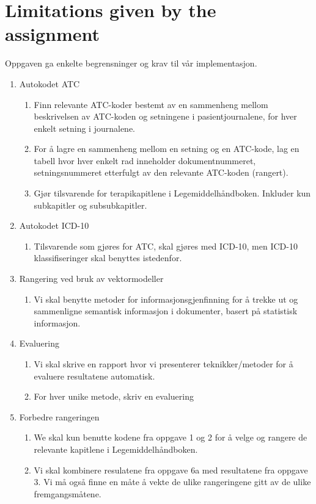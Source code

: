 \section{Limitations given by the assignment}

Oppgaven ga enkelte begrensninger og krav til vår implementasjon.
\begin{enumerate}
\item{Autokodet ATC}
\begin{enumerate}
\item{Finn relevante ATC-koder bestemt av en sammenheng mellom beskrivelsen av ATC-koden og setningene i pasientjournalene, for hver enkelt setning i journalene.}
\item{For å lagre en sammenheng mellom en setning og en ATC-kode, lag en tabell hvor hver enkelt rad inneholder dokumentnummeret, setningsnummeret etterfulgt av den relevante ATC-koden (rangert).}
\item{Gjør tilsvarende for terapikapitlene i Legemiddelhåndboken. Inkluder kun subkapitler og subsubkapitler.}
\end{enumerate}
\item{Autokodet ICD-10}
\begin{enumerate}
\item{Tilsvarende som gjøres for ATC, skal gjøres med ICD-10, men ICD-10 klassifiseringer skal benyttes istedenfor.}
\end{enumerate}
\item{Rangering ved bruk av vektormodeller}
\begin{enumerate}
\item{Vi skal benytte metoder for informasjonsgjenfinning for å trekke ut og sammenligne semantisk informasjon i dokumenter, basert på statistisk informasjon.}
\end{enumerate}
\item{Evaluering}
\begin{enumerate}
\item{Vi skal skrive en rapport hvor vi presenterer teknikker/metoder for å evaluere resultatene automatisk.}
\item{For hver unike metode, skriv en evaluering}
\end{enumerate}
\item{Forbedre rangeringen}
\begin{enumerate}
\item{We skal kun benutte kodene fra oppgave 1 og 2 for å velge og rangere de relevante kapitlene i Legemiddelhåndboken.}
\item{Vi skal kombinere resulatene fra oppgave 6a med resultatene fra oppgave 3. Vi må også finne en måte å vekte de ulike rangeringene gitt av de ulike fremgangsmåtene.}

\end{enumerate}
\end{enumerate}
